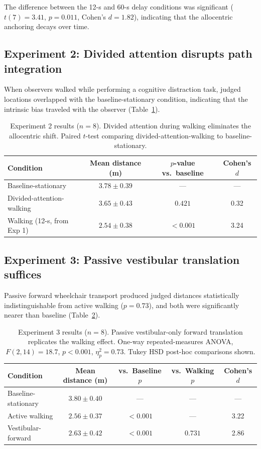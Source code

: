 \documentclass[11pt]{article}
\begin{document}
The difference between the 12-s and 60-s delay conditions was significant ($t(7) = 3.41$, $p = 0.011$, Cohen's $d = 1.82$), indicating that the allocentric anchoring decays over time.

\subsection{Experiment 2: Divided attention disrupts path integration}

When observers walked while performing a cognitive distraction task, judged locations overlapped with the baseline-stationary condition, indicating that the intrinsic bias traveled with the observer (Table~\ref{tab:exp2}).

\begin{table}[H]
\centering
\caption{Experiment 2 results ($n = 8$). Divided attention during walking eliminates the allocentric shift. Paired $t$-test comparing divided-attention-walking to baseline-stationary.}
\label{tab:exp2}
\begin{tabular}{lccc}
\toprule
\textbf{Condition} & \textbf{Mean distance (m)} & \textbf{$p$-value vs.\ baseline} & \textbf{Cohen's $d$} \\
\midrule
Baseline-stationary & $3.78 \pm 0.39$ & --- & --- \\
Divided-attention-walking & $3.65 \pm 0.43$ & $0.421$ & 0.32 \\
Walking (12-s, from Exp 1) & $2.54 \pm 0.38$ & $< 0.001$ & 3.24 \\
\bottomrule
\end{tabular}
\end{table}

\subsection{Experiment 3: Passive vestibular translation suffices}

Passive forward wheelchair transport produced judged distances statistically indistinguishable from active walking ($p = 0.73$), and both were significantly nearer than baseline (Table~\ref{tab:exp3}).

\begin{table}[H]
\centering
\caption{Experiment 3 results ($n = 8$). Passive vestibular-only forward translation replicates the walking effect. One-way repeated-measures ANOVA, $F(2,14) = 18.7$, $p < 0.001$, $\eta^2_p = 0.73$. Tukey HSD post-hoc comparisons shown.}
\label{tab:exp3}
\begin{tabular}{lcccc}
\toprule
\textbf{Condition} & \textbf{Mean distance (m)} & \textbf{vs.\ Baseline $p$} & \textbf{vs.\ Walking $p$} & \textbf{Cohen's $d$} \\
\midrule
Baseline-stationary & $3.80 \pm 0.40$ & --- & --- & --- \\
Active walking & $2.56 \pm 0.37$ & $< 0.001$ & --- & 3.22 \\
Vestibular-forward & $2.63 \pm 0.42$ & $< 0.001$ & $0.731$ & 2.86 \\
\bottomrule
\end{tabular}
\end{table}
\end{document}
